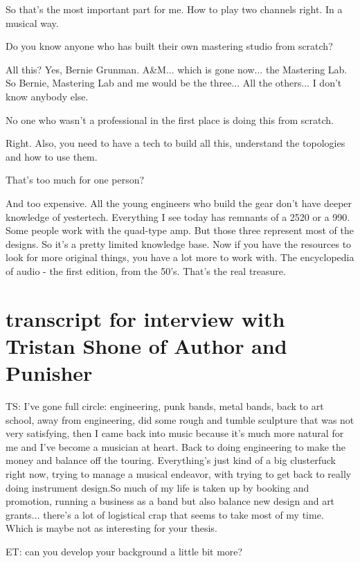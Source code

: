 So that's the most important part for me. How to play two channels right. In a musical way.

Do you know anyone who has built their own mastering studio from scratch?

All this? Yes, Bernie Grunman. A\&M... which is gone now... the Mastering Lab. So Bernie, Mastering Lab and me would be the three... All the others... I don't know anybody else.

No one who wasn't a professional in the first place is doing this from scratch.

Right. Also, you need to have a tech to build all this, understand the topologies and how to use them.

That's too much for one person?

And too expensive. All the young engineers who build the gear don't have deeper knowledge of yestertech. Everything I see today has remnants of a 2520 or a 990. Some people work with the quad-type amp. But those three represent most of the designs. So it's a pretty limited knowledge base. Now if you have the resources to look for more original things, you have a lot more to work with. The encyclopedia of audio - the first edition, from the 50's. That's the real treasure.

\section{transcript for interview with Tristan Shone of Author and Punisher}

TS: I've gone full circle: engineering, punk bands, metal bands, back to art school, away from engineering, did some rough and tumble sculpture that was not very satisfying, then I came back into music because it's much more natural for me and I've become a musician at heart. Back to doing engineering to make the money and balance off the touring. Everything's just kind of a big clusterfuck right now, trying to manage a musical endeavor, with trying to get back to really doing instrument design.So much of my life is taken up by booking and promotion, running a business as a band but also balance new design and art grants... there's a lot of logistical crap that seems to take most of my time. Which is maybe not as interesting for your thesis. 

ET: can you develop your background a little bit more?

